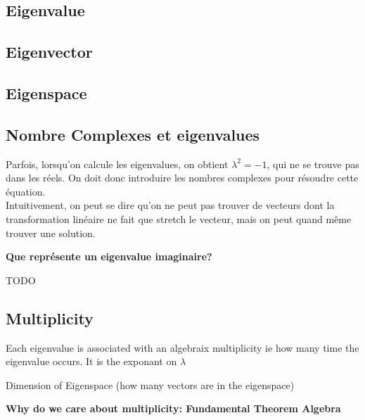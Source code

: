 \documentclass{article}
\begin{document}
\subsection{Eigenvalue}%
\label{sub:Eigenvalue}

\subsection{Eigenvector}%
\label{sub:Eigenvector}

\subsection{Eigenspace}%
\label{sub:Eigenspace}

\subsection{Nombre Complexes et eigenvalues}

Parfois, lorsqu'on calcule les eigenvalues, on obtient $ \lambda ^ 2 = -1$,
qui ne se trouve pas dans les réels. On doit donc introduire les nombres
complexes pour résoudre cette équation.\\

Intuitivement, on peut se dire qu'on ne peut pas trouver de vecteurs dont la
transformation linéaire ne fait que stretch le vecteur, mais on peut quand
même trouver une solution.

\textbf{Que représente un eigenvalue imaginaire?}

TODO

\subsection{Multiplicity}%
\label{sub:Multiplicity}

\begin{definition}
    Each eigenvalue is associated with an algebraix multiplicity ie how
    many time the eigenvalue occurs. It is the exponant on $\lambda$
\end{definition}

\begin{definition}
    Dimension of Eigenspace (how many vectors are in the eigenspace)
\end{definition}

\textbf{Why do we care about multiplicity: Fundamental Theorem Algebra}

\begin{theorem}
\end{theorem}
\end{document}
